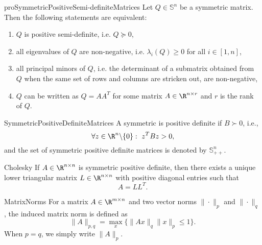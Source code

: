 \begin{pro}{proSymmetricPositiveSemi-definiteMatrices}
    Let $Q \in \mathbb{S}^n$ be a symmetric matrix. Then the following statements are equivalent:
    \begin{enumerate}
        \item $Q$ is positive semi-definite, i\@.e\@. $Q \succeq 0$,
        \item all eigenvalues of $Q$ are non-negative, i\@.e\@. $\lambda_i(Q) \geq 0$ for all $i \in [1,n]$,
        \item all principal minors of $Q$, i\@.e\@. the determinant of a submatrix obtained from $Q$ when the same set of rows and columns are stricken out, are non-negative,
        \item $Q$ can be written as $Q = AA^T$ for some matrix $A \in \R^{n \times r}$ and $r$ is the rank of $Q$.
    \end{enumerate}
    \vspace*{-0.3cm}
\end{pro}

\begin{theo}{SymmetricPositiveDefiniteMatrices}
    A symmetric is positive definite if $B \succ 0$, i\@.e\@.,
    \begin{equation*}
        \forall z \in \R^n \backslash \{0\}: \ z^T B z > 0,
    \end{equation*}
    and the set of symmetric positive definite matrices is denoted by $\mathbb{S}^n_{++}$.
\end{theo}

\begin{theo}{Cholesky}
    If $A \in \R^{n \times n}$ is symmetric positive definite, then there exists a unique lower triangular matrix $L \in \R^{n \times n}$ with positive diagonal entries such that
    \begin{equation*}
        A = LL^T.
    \end{equation*}
    \vspace*{-0.5cm}
\end{theo}

\begin{theo}{MatrixNorms}
    For a matrix $A \in \R^{m \times n}$ and two vector norms $\|\cdot\|_p$ and $\|\cdot\|_q$, the induced matrix norm is defined as 
    \begin{equation*}
        \|A\|_{p,q} = \max_{x} \{ \|Ax\|_q \|x\|_p \leq 1 \}.
    \end{equation*}
    When $p = q$, we simply write $\|A\|_p$. 
\end{theo}

